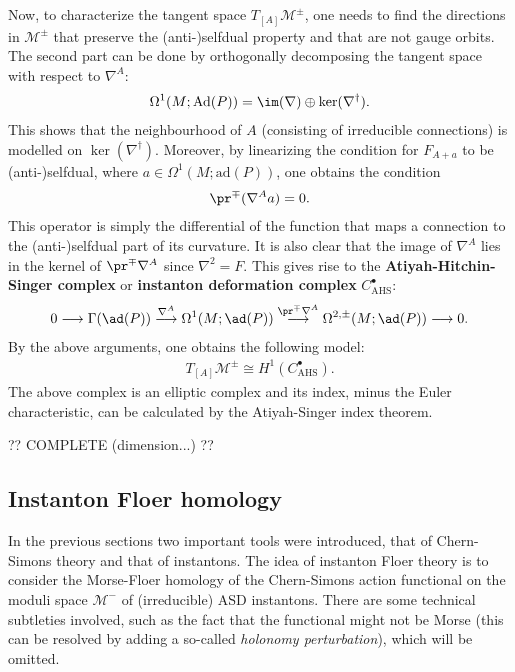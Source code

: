     Now, to characterize the tangent space $T_{[A]}\mathcal{M}^\pm$, one needs to find the directions in $\mathcal{M}^\pm$ that preserve the (anti-)selfdual property and that are not gauge orbits. The second part can be done by orthogonally decomposing the tangent space with respect to $\nabla^A$:
    \begin{gather}
        \Omega^1(M;\mathrm{Ad}(P))=\im(\nabla)\oplus\ker(\nabla^\dagger).
    \end{gather}
    This shows that the neighbourhood of $A$ (consisting of irreducible connections) is modelled on $\ker(\nabla^\dagger)$. Moreover, by linearizing the condition for $F_{A+a}$ to be (anti-)selfdual, where $a\in\Omega^1(M;\mathrm{ad}(P))$, one obtains the condition
    \begin{gather}
        \pr^\mp(\nabla^Aa)=0.
    \end{gather}
    This operator is simply the differential of the function that maps a connection to the (anti-)selfdual part of its curvature. It is also clear that the image of $\nabla^A$ lies in the kernel of $\pr^\mp\nabla^A$ since $\nabla^2=F$. This gives rise to the \textbf{Atiyah-Hitchin-Singer complex} or \textbf{instanton deformation complex} $C^\bullet_\mathrm{AHS}$:
    \begin{gather}
        0\longrightarrow\Gamma(\ad(P))\overset{\nabla^A}{\longrightarrow}\Omega^1(M;\ad(P))\overset{\pr^\mp\nabla^A}{\longrightarrow}\Omega^{2,\pm}(M;\ad(P))\longrightarrow0.
    \end{gather}
    By the above arguments, one obtains the following model:
    \begin{gather}
        T_{[A]}\mathcal{M}^\pm\cong H^1(C^\bullet_\mathrm{AHS}).
    \end{gather}
    The above complex is an elliptic complex and its index, minus the Euler characteristic, can be calculated by the Atiyah-Singer index theorem.

    ?? COMPLETE (dimension...) ??

\subsection{Instanton Floer homology}

    In the previous sections two important tools were introduced, that of Chern-Simons theory and that of instantons. The idea of instanton Floer theory is to consider the Morse-Floer homology of the Chern-Simons action functional on the moduli space $\mathcal{M}^-$ of (irreducible) ASD instantons. There are some technical subtleties involved, such as the fact that the functional might not be Morse (this can be resolved by adding a so-called \textit{holonomy perturbation}), which will be omitted.

